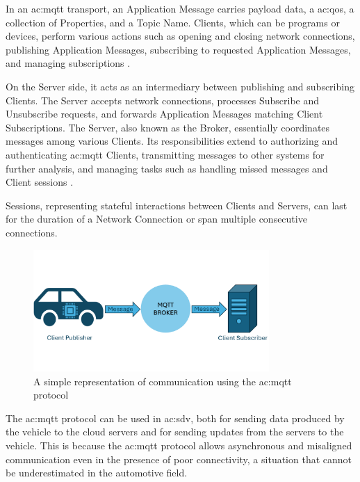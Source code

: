 \begin{itemize}
    In an \gls{ac:mqtt} transport, an Application Message carries payload data, a \gls{ac:qos}, a collection of Properties, and a Topic Name. Clients, which can be programs or devices, perform various actions such as opening and closing network connections, publishing Application Messages, subscribing to requested Application Messages, and managing subscriptions \cite{MQTTVersion5.0}.

    On the Server side, it acts as an intermediary between publishing and subscribing Clients. The Server accepts network connections, processes Subscribe and Unsubscribe requests, and forwards Application Messages matching Client Subscriptions. The Server, also known as the Broker, essentially coordinates messages among various Clients. Its responsibilities extend to authorizing and authenticating \gls{ac:mqtt} Clients, transmitting messages to other systems for further analysis, and managing tasks such as handling missed messages and Client sessions \cite{MQTTAWS}.

    Sessions, representing stateful interactions between Clients and Servers, can last for the duration of a Network Connection or span multiple consecutive connections.
     \begin{figure}[h]  %
        \centering
        \includegraphics[width=0.8\textwidth]{images/MQTTProtocol.png}  %
        \caption{A simple representation of communication using the \gls{ac:mqtt} protocol}
        \label{fig:MQTTProtocol}
    \end{figure}

    The \gls{ac:mqtt} protocol can be used in \gls{ac:sdv}, both for sending data produced by the vehicle to the cloud servers and for sending updates from the servers to the vehicle. This is because the \gls{ac:mqtt} protocol allows asynchronous and misaligned communication even in the presence of poor connectivity, a situation that cannot be underestimated in the automotive field.
\end{itemize}

